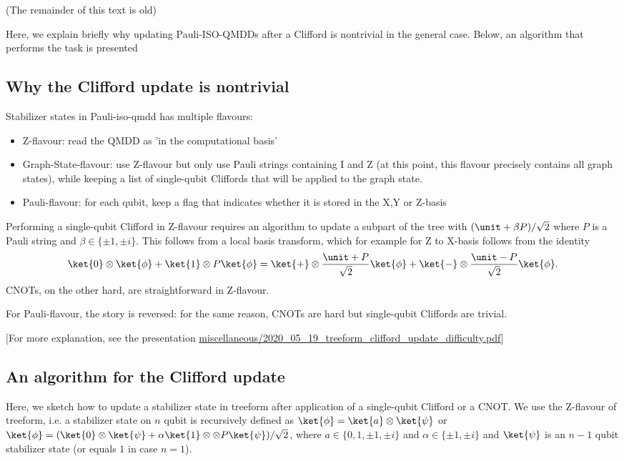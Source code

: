 (The remainder of this text is old)

Here, we explain briefly why updating Pauli-ISO-QMDDs after a Clifford is nontrivial in the general case.
Below, an algorithm that performs the task is presented

\subsection{Why the Clifford update is nontrivial}

Stabilizer states in Pauli-iso-qmdd has multiple flavours:

\begin{itemize}
\item Z-flavour: read the QMDD as 'in the computational basis'
\item Graph-State-flavour: use Z-flavour but only use Pauli strings containing I and Z (at this point, this flavour precisely contains all graph states), while keeping a list of single-qubit Cliffords that will be applied to the graph state.
\item Pauli-flavour: for each qubit, keep a flag that indicates whether it is stored in the X,Y or Z-basis
\end{itemize}


Performing a single-qubit Clifford in Z-flavour requires an algorithm to update a subpart of the tree with $(\unit + \beta P) / \sqrt{2}$ where $P$ is a Pauli string and $\beta \in \{\pm 1, \pm i\}$.
This follows from a local basis transform, which for example for Z to X-basis follows from the identity
\[
    \ket{0} \otimes \ket{\phi} + \ket{1} \otimes P\ket{\phi}
    = 
    \ket{+} \otimes \frac{\unit + P}{\sqrt{2}} \ket{\phi} + \ket{-} \otimes \frac{\unit - P}{\sqrt{2}}\ket{\phi}
.
\]
CNOTs, on the other hard, are straightforward in Z-flavour.

For Pauli-flavour, the story is reversed: for the same reason, CNOTs are hard but single-qubit Cliffords are trivial.

[For more explanation, see the presentation \url{miscellaneous/2020_05_19_treeform_clifford_update_difficulty.pdf}]



\subsection{An algorithm for the Clifford update}

Here, we sketch how to update a stabilizer state in treeform after application of a single-qubit Clifford or a CNOT.
We use the Z-flavour of treeform, i.e. a stabilizer state on $n$ qubit is recursively defined as $\ket{\phi} = \ket{a} \otimes \ket{\psi}$ or $\ket{\phi} = (\ket{0} \otimes \ket{\psi} + \alpha \ket{1}\otimes \otimes P \ket{\psi}) / \sqrt{2}$, where $a \in \{0, 1, \pm 1, \pm i\}$ and $\alpha \in \{\pm 1, \pm i\}$ and $\ket{\psi}$ is an $n-1$ qubit stabilizer state (or equals $1$ in case $n=1$).

